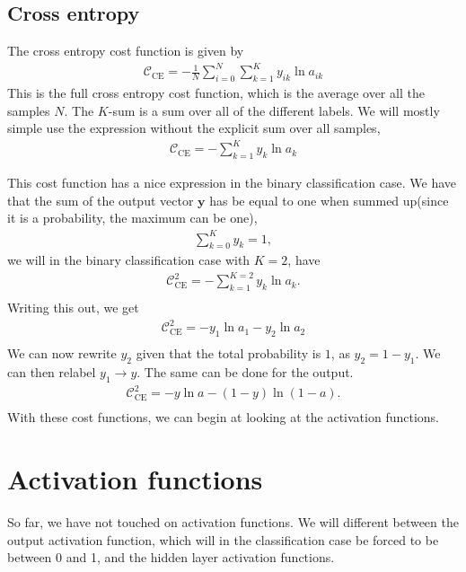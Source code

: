 \documentclass[a4paper,10pt]{article}
\begin{document}
\subsection{Cross entropy}
The cross entropy cost function is given by
\begin{align}
    \mathcal{C}_\mathrm{CE} = - \frac{1}{N}\sum_{i=0}^{N} \sum^K_{k=1} y_{ik} \ln a_{ik}
    \label{eq:full-cross-entropy}
\end{align}
This is the full cross entropy cost function, which is the average over all the samples $N$. The $K$-sum is a sum over all of the different labels. We will mostly simple use the expression without the explicit sum over all samples,
\begin{align}
    \mathcal{C}_\mathrm{CE} = - \sum^K_{k=1} y_{k} \ln a_{k}
    \label{eq:cross-entropy}
\end{align}

This cost function has a nice expression in the binary classification case. We have that the sum of the output vector $\bm{y}$ has be equal to one when summed up(since it is a probability, the maximum can be one),
\begin{align*}
    \sum^K_{k=0} y_k = 1,
\end{align*}
we will in the binary classification case with $K=2$, have
\begin{align*}
    \mathcal{C}^2_\mathrm{CE} = - \sum^{K=2}_{k=1} y_{k} \ln a_{k}. \\
\end{align*}
Writing this out, we get
\begin{align*}
    \mathcal{C}^2_\mathrm{CE} = - y_1 \ln a_1 - y_2 \ln a_2 \\
\end{align*}
We can now rewrite $y_2$ given that the total probability is $1$, as $y_2 = 1 - y_1$. We can then relabel $y_1\rightarrow y$. The same can be done for the output.
\begin{align}
    \mathcal{C}^2_\mathrm{CE} = - y \ln a - (1 - y) \ln (1 - a). \\
    \label{eq:binary-cross-entropy}
\end{align}
With these cost functions, we can begin at looking at the activation functions.

\section{Activation functions}
So far, we have not touched on activation functions. We will different between the output activation function, which will in the classification case be forced to be between 0 and 1, and the hidden layer activation functions.
\end{document}
